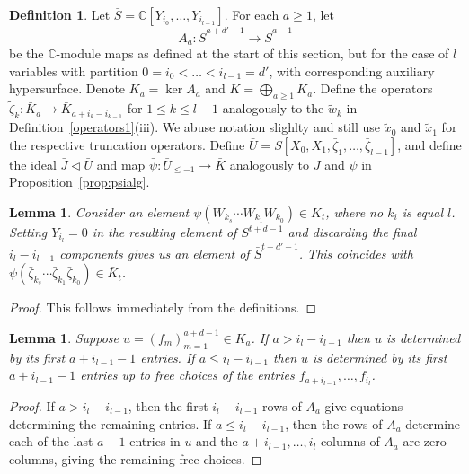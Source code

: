 \documentclass[a4paper,11pt]{amsart}
\theoremstyle{plain}
\newtheorem{lemma}[theorem]{Lemma}
\theoremstyle{definition}
\newtheorem{definition}[theorem]{Definition}
\newcommand{\C}{\mathbb{C}}
\begin{document}
\begin{definition}\label{def:inductionbar} Let $\bar S = \C[Y_{i_0},\dots,Y_{i_{l-1}}]$. For each $a \geq 1$, let 
\[\bar A_a : \bar S^{a+d'-1} \rightarrow \bar S^{a-1}\]
be the $\C$-module maps as defined at the start of this section, but for the case of $l$ variables with partition $0 = i_0 < \dots < i_{l-1} = d'$, with corresponding auxiliary hypersurface. Denote $\bar K_a=\ker \bar A_a$ and $\bar K = \bigoplus_{a \geq 1} \bar K_a$. Define the operators $\tilde \zeta_k\colon\bar K_a\to \bar K_{a+i_k - i_{k-1}}$ for $1 \leq k \leq l-1$ analogously to the $\tilde w_k$ in Definition~\ref{operators1}(iii). We abuse notation slighlty and still use $\tilde x_0$ and $\tilde x_1$ for the respective truncation operators. Define $\bar U = S[X_0,X_1,\bar \zeta_1,\dots,\bar \zeta_{l-1}]$, and define the ideal $\bar J \lhd \bar U$ and map $\bar \psi : \bar U_{\leq -1} \rightarrow \bar K$ analogously to $J$ and $\psi$ in Proposition~\ref{prop:psialg}.
\end{definition}

\begin{lemma}\label{lem:inductionw}
    Consider an element $\psi (W_{k_s} \cdots W_{k_1} W_{k_0}) \in K_t$, where no $k_i$ is equal $l$. Setting $Y_{i_{l}} = 0$ in the resulting element of $S^{t+d-1}$ and discarding the final $i_l - i_{l-1}$ components gives us an element of $\bar S^{t+d'-1}$. This coincides with $\psi(\bar \zeta_{k_s} \cdots \bar \zeta_{k_1} \bar \zeta_{k_0}) \in \bar K_{t}$.
\end{lemma}

\begin{proof}
    This follows immediately from the definitions.
\end{proof}

\begin{lemma}\label{lem:inddet}
    Suppose $u = (f_m)_{m = 1}^{a + d-1} \in K_a$. If $a > i_l - i_{l-1}$ then $u$ is determined by its first $a + i_{l-1} - 1$ entries. If $a \leq i_l - i_{l-1}$ then $u$ is determined by its first $a + i_{l-1} - 1$ entries up to free choices of the entries $f_{a+ i_{l-1}},\dots, f_{i_l}$.
\end{lemma}

\begin{proof}
    If $a > i_l - i_{l-1}$, then the first $i_l - i_{l-1}$ rows of $A_a$ give equations determining the remaining entries. If $a \leq i_l - i_{l-1}$, then the rows of $A_a$ determine each of the last $a-1$ entries in $u$ and the $a+i_{l-1}, \dots, i_l$ columns of $A_a$ are zero columns, giving the remaining free choices.
\end{proof}
\end{document}
